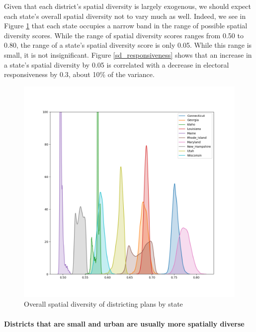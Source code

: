 \documentclass[]{article}
\let\oldparagraph\paragraph
\renewcommand{\paragraph}[1]{\oldparagraph{#1}\mbox{}}
\begin{document}
Given that each district's spatial diversity is largely exogenous, we
should expect each state's overall spatial diversity not to vary much as
well. Indeed, we see in Figure \ref{sd_plans} that each state occupies a
narrow band in the range of possible spatial diversity scores. While the
range of spatial diversity scores ranges from 0.50 to 0.80, the range of
a state's spatial diversity score is only 0.05. While this range is
small, it is not insignificant. Figure \ref{sd_responsiveness} shows
that an increase in a state's spatial diversity by 0.05 is correlated
with a decrease in electoral responsiveness by 0.3, about 10\% of the
variance.

\begin{figure}
\centering
\includegraphics{../30_results/all_plans_sd.png}
\caption{Overall spatial diversity of districting plans by state
\label{sd_plans}}
\end{figure}

\hypertarget{districts-that-are-small-and-urban-are-usually-more-spatially-diverse}{%
\paragraph{Districts that are small and urban are usually more spatially
diverse}\label{districts-that-are-small-and-urban-are-usually-more-spatially-diverse}}
\end{document}
